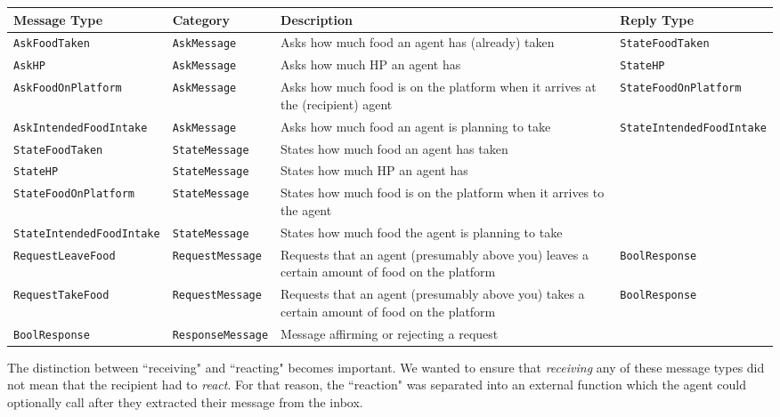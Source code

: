 \begin{center}
\begin{longtable}{p{4cm}p{2.5cm}p{4cm}p{4cm}}
 \hline
 \textbf{Message Type} & \textbf{Category} & \textbf{Description} & \textbf{Reply Type} \\ [0.5ex] 
 \hline\hline
 \texttt{AskFoodTaken} & \texttt{AskMessage} & Asks how much food an agent has (already) taken
 & \texttt{StateFoodTaken} \\ 
 \hline
 \texttt{AskHP} & \texttt{AskMessage} & Asks how much HP an agent has & \texttt{StateHP} \\ 
  \hline
 \texttt{AskFoodOnPlatform} & \texttt{AskMessage} & Asks how much food is on the platform when it arrives at the (recipient) agent & \texttt{StateFoodOnPlatform} \\ 
 \hline
 \texttt{AskIntendedFoodIntake} & \texttt{AskMessage} & Asks how much food an agent is planning to take & \texttt{StateIntendedFoodIntake} \\ 
 \hline
 \texttt{StateFoodTaken} & \texttt{StateMessage} & States how much food an agent has taken &   \\
 \hline
 \texttt{StateHP} & \texttt{StateMessage} & States how much HP an agent has &   \\
 \hline
 \texttt{StateFoodOnPlatform} & \texttt{StateMessage} & States how much food is on the platform when it arrives to the agent &  
 \\
 \hline
 \texttt{StateIntendedFoodIntake} & \texttt{StateMessage} & States how much food the agent is planning to take &  
 \\
 \hline
 \texttt{RequestLeaveFood} & \texttt{RequestMessage} & Requests that an agent (presumably above you) leaves a certain amount of food on the platform & \texttt{BoolResponse}
 \\
 \hline
 \texttt{RequestTakeFood} & \texttt{RequestMessage} & Requests that an agent (presumably above you) takes a certain amount of food on the platform & \texttt{BoolResponse}
 \\
 \hline
 \texttt{BoolResponse} & \texttt{ResponseMessage} & Message affirming or rejecting a request &  
\end{longtable}
\end{center}
The distinction between ``receiving" and ``reacting" becomes important. We wanted to ensure that \textit{receiving} any of these message types did not mean that the recipient had to \textit{react}. For that reason, the ``reaction" was separated into an external function which the agent could optionally call after they extracted their message from the inbox. \newline
